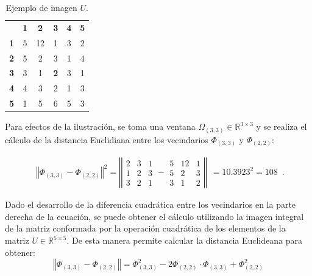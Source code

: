 \begin{table}
\begin{center}
\caption{Ejemplo de imagen $U$.}

\renewcommand{\arraystretch}{1.4}
\setlength\tabcolsep{3pt}

{
\begin{tabular}{cc|ccc|c}
 & \multicolumn{1}{c}{\textbf{1}} & \textbf{2} & \textbf{3} & \multicolumn{1}{c}{\textbf{4}} & \textbf{5}\tabularnewline
\textbf{1} & \multicolumn{1}{c}{5} & 12 & 1 & \multicolumn{1}{c}{3} & 2\tabularnewline
\cline{3-5} 
\textbf{2} & 5 & 2 & 3 & 1 & 4\tabularnewline
\textbf{3} & 3 & 1 & \textbf{2} & 3 & 1\tabularnewline
\textbf{4} & 4 & 3 & 2 & 1 & 3\tabularnewline
\cline{3-5} 
\textbf{5} & \multicolumn{1}{c}{1} & 5 & 6 & \multicolumn{1}{c}{5} & 3\tabularnewline
\end{tabular}
}
\par\end{center} \label{tab_ImageExample}
\end{table}




Para efectos de la ilustraci\'on, se toma una ventana $\Omega_{\left(3,3\right)}\in\mathbb{R}^{3\times3}$  y se realiza  el c\'alculo de la distancia Euclidiana entre los vecindarios $\varPhi_{\left(3,3\right)}$ y $\varPhi_{\left(2,2\right)}$:

\begin{equation}
\label{eq:resultado1}
\begin{array}{c}
\left\Vert \varPhi_{\left(3,3\right)}-\varPhi_{\left(2,2\right)}\right\Vert ^{2}=\left\Vert \begin{array}{ccc}
2 & 3 & 1\\
1 & 2 & 3\\
3 & 2 & 1
\end{array}-\begin{array}{ccc}
5 & 12 & 1\\
5 & 2 & 3\\
3 & 1 & 2
\end{array}\right\Vert\end{array}
=10.3923^{2}=108 \enspace .
\end{equation}



 Dado el desarrollo de la diferencia cuadr\'atica entre los vecindarios en la parte derecha de la ecuaci\'on, se puede obtener el c\'alculo utilizando la imagen integral de la matriz conformada por la operaci\'on cuadr\'atica de los elementos de la matriz $U\in\mathbb{R}^{5\times5}$. De esta manera permite calcular la distancia Euclideana para obtener: 
\begin{equation}
\left\Vert \varPhi_{\left(3,3\right)}-\varPhi_{\left(2,2\right)}\right\Vert =\varPhi_{\left(3,3\right)}^{2}-2\varPhi_{\left(2,2\right)}\cdot\varPhi_{\left(3,3\right)}+\varPhi_{\left(2,2\right)}^{2} 
\end{equation}


